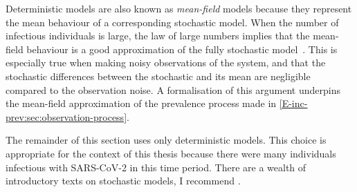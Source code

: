 \documentclass[thesis.tex]{subfiles}
\begin{document}
Deterministic models are also known as \emph{mean-field} models because they represent the mean behaviour of a corresponding stochastic model.
When the number of infectious individuals is large, the law of large numbers implies that the mean-field behaviour is a good approximation of the fully stochastic model~\autocite[20]{diekmannMathematical}.
This is especially true when making noisy observations of the system, and that the stochastic differences between the stochastic and its mean are negligible compared to the observation noise.
A formalisation of this argument underpins the mean-field approximation of the prevalence process made in \cref{E-inc-prev:sec:observation-process}.

The remainder of this section uses only deterministic models.
This choice is appropriate for the context of this thesis because there were many individuals infectious with SARS-CoV-2 in this time period.
There are a wealth of introductory texts on stochastic models, I recommend \textcite[chapter 6]{keelingModeling}.




\end{document}
